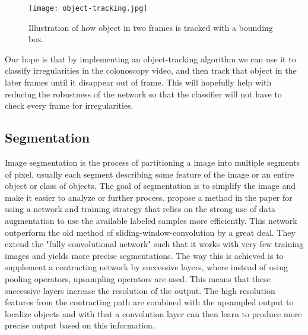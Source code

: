 \documentclass[thesis.tex]{subfiles}
\begin{document}
\begin{figure}[H] %
  \begin{center}
    \texttt{[image: object-tracking.jpg]}
    \caption[Illustration of how object in two frames is tracked with a bounding box]{Illustration of how object in two frames is tracked with a bounding box\footnotemark. }
    \label{fig:object-tracking}
  \end{center}
\end{figure}


Our hope is that by implementing an object-tracking algorithm we can use it to classify irregularities in the colonoscopy video, and then track that object in the later frames until it disappear out of frame. This will hopefully help with reducing the robustness of the network so that the classifier will not have to check every frame for irregularities. 


\subsection{Segmentation} \label{sec:segmentation}
Image segmentation is the process of partitioning a image into multiple segments of pixel, usually each segment describing some feature of the image or an entire object or class of objects. The goal of segmentation is to simplify the image and make it easier to analyze or further process. \citeauthor*{UNetConvolutional15} propose a method in the paper  \cite{UNetConvolutional15} for using a network and training strategy that relies on the strong use of data augmentation to use the available labeled samples more efficiently. This network outperform the old method of sliding-window-convolution by a great deal. They extend the "fully convolutional network" \cite{FullyConvolutional15} such that it works with very few training images and yields more precise segmentations. The way this is achieved is to supplement a contracting network by successive layers, where instead of using pooling operators, upsampling operators are used. This means that these successive layers increase the resolution of the output. The high resolution features from the contracting path are combined with the upsampled output to localize objects and with that a convolution layer can then learn to produce more precise output based on this information. 
\end{document}
